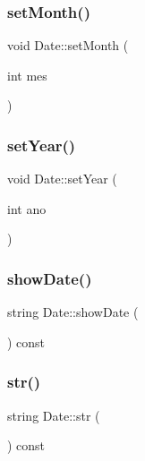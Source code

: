 \hypertarget{class_date_a11b56160e1dbb550b68a7dd54c968204}{}\label{class_date_a11b56160e1dbb550b68a7dd54c968204} 
\subsubsection{\texorpdfstring{set\+Month()}{setMonth()}}
{\footnotesize\ttfamily void Date\+::set\+Month (\begin{DoxyParamCaption}\item[{int}]{mes }\end{DoxyParamCaption})}

\hypertarget{class_date_a62230a93ff2ce92cd4b30408622393af}{}\label{class_date_a62230a93ff2ce92cd4b30408622393af} 
\subsubsection{\texorpdfstring{set\+Year()}{setYear()}}
{\footnotesize\ttfamily void Date\+::set\+Year (\begin{DoxyParamCaption}\item[{int}]{ano }\end{DoxyParamCaption})}

\hypertarget{class_date_affb645fa983d4e0317ba0aa8f5998fd1}{}\label{class_date_affb645fa983d4e0317ba0aa8f5998fd1} 
\subsubsection{\texorpdfstring{show\+Date()}{showDate()}}
{\footnotesize\ttfamily string Date\+::show\+Date (\begin{DoxyParamCaption}{ }\end{DoxyParamCaption}) const}

\hypertarget{class_date_a5ea4980f43e2b098e033651e199d2793}{}\label{class_date_a5ea4980f43e2b098e033651e199d2793} 
\subsubsection{\texorpdfstring{str()}{str()}}
{\footnotesize\ttfamily string Date\+::str (\begin{DoxyParamCaption}{ }\end{DoxyParamCaption}) const}



